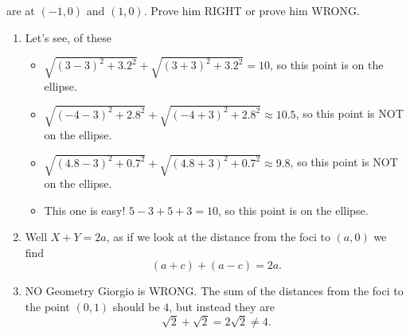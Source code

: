 \documentclass[nooutcomes,noauthor,handout,12pt]{ximera}
\begin{document}
\begin{question}
\begin{enumerate}
\begin{center}
      \end{center}
      are at $(-1,0)$ and $(1,0)$. Prove him RIGHT or prove him WRONG.
  \end{enumerate}
  \begin{freeResponse}
    \begin{enumerate}
    \item Let's see, of these
      \begin{itemize}
      \item $\sqrt{(3-3)^2+3.2^2} + \sqrt{(3+3)^2 + 3.2^2} = 10$, so this point is on the ellipse.
      \item $\sqrt{(-4-3)^2+2.8^2} + \sqrt{(-4+3)^2 + 2.8^2} \approx 10.5$, so this point is NOT on the ellipse.
      \item $\sqrt{(4.8-3)^2+0.7^2} + \sqrt{(4.8+3)^2 + 0.7^2} \approx 9.8$, so this point is NOT on the ellipse.
      \item This one is easy! $5-3+5+3 = 10$, so this point is on the ellipse.
      \end{itemize}
    \item Well $X+Y=2a$, as if we look at the distance from the foci to $(a,0)$ we find
      \[
      (a+c) + (a-c) = 2a.
      \]
    \item NO Geometry Giorgio is WRONG. The sum of the distances from
      the foci to the point $(0,1)$ should be $4$, but instead they
      are
      \[
      \sqrt{2} + \sqrt{2} = 2\sqrt{2} \ne 4.
      \]
    \end{enumerate}
  \end{freeResponse}
\end{question}
\mynewpage
\end{document}
